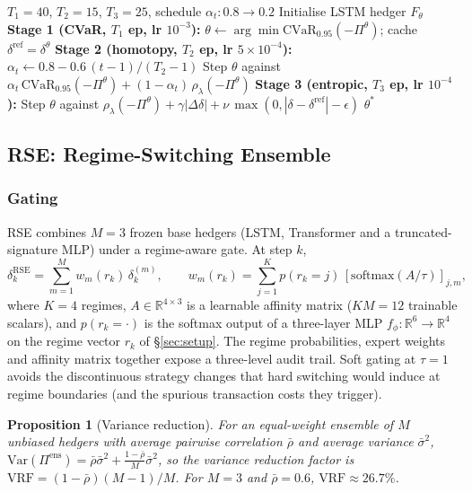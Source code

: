 \documentclass[10pt,letterpaper]{article}
\newcommand{\cvar}{\mathrm{CVaR}}
\newcommand{\R}{\mathbb{R}}
\newtheorem{proposition}{Proposition}
\let\STATE\State
\let\REQUIRE\Require
\let\RETURN\Return
\begin{document}
\begin{algorithm}[ht]
\caption{3SCH curriculum schedule}\label{alg:3sch}
\begin{algorithmic}[1]
\REQUIRE $T_1=40$, $T_2=15$, $T_3=25$, schedule $\alpha_t:0.8\to0.2$
\STATE Initialise LSTM hedger $F_\theta$
\STATE \textbf{Stage 1 (CVaR, $T_1$ ep, lr $10^{-3}$):}
$\theta\leftarrow\arg\min\cvar_{0.95}(-\Pi^\theta)$; cache
$\delta^{\mathrm{ref}}=\delta^\theta$
\STATE \textbf{Stage 2 (homotopy, $T_2$ ep, lr $5\!\times\!10^{-4}$):}
  \STATE $\alpha_t\gets 0.8-0.6\,(t-1)/(T_2-1)$
  \STATE Step $\theta$ against
  $\alpha_t\,\cvar_{0.95}(-\Pi^\theta)+(1-\alpha_t)\,\rho_\lambda(-\Pi^\theta)$
\ENDFOR
\STATE \textbf{Stage 3 (entropic, $T_3$ ep, lr $10^{-4}$):}
  \STATE Step $\theta$ against $\rho_\lambda(-\Pi^\theta)
  + \gamma|\Delta\delta|
  + \nu\,\max(0,|\delta-\delta^{\mathrm{ref}}|-\epsilon)$
\ENDFOR
\STATE \RETURN $\theta^*$
\end{algorithmic}
\end{algorithm}

\subsection{RSE: Regime-Switching Ensemble}\label{sec:rse}

\subsubsection*{Gating}

RSE combines $M=3$ frozen base hedgers (LSTM, Transformer and a
truncated-signature MLP) under a regime-aware gate. At step $k$,
\begin{equation}
\delta_k^{\mathrm{RSE}} = \sum_{m=1}^M w_m(r_k)\,\delta_k^{(m)},\qquad
w_m(r_k) = \sum_{j=1}^K p(r_k=j)\,[\mathrm{softmax}(A/\tau)]_{j,m},
\label{eq:rse}
\end{equation}
where $K=4$ regimes, $A\in\R^{4\times 3}$ is a learnable affinity
matrix ($KM=12$ trainable scalars), and $p(r_k=\cdot)$ is the softmax
output of a three-layer MLP $f_\phi:\R^6\to\R^4$ on the regime
vector $r_k$ of \S\ref{sec:setup}. The regime probabilities, expert
weights and affinity matrix together expose a three-level audit
trail. Soft gating at $\tau=1$ avoids the discontinuous strategy
changes that hard switching would induce at regime boundaries (and
the spurious transaction costs they trigger).

\begin{proposition}[Variance reduction]\label{prop:vrf}
For an equal-weight ensemble of $M$ unbiased hedgers with average
pairwise correlation $\bar\rho$ and average variance $\bar\sigma^2$,
$\mathrm{Var}(\Pi^{\mathrm{ens}})=\bar\rho\bar\sigma^2 +
\tfrac{1-\bar\rho}{M}\bar\sigma^2$, so the variance reduction factor
is $\mathrm{VRF}=(1-\bar\rho)(M-1)/M$. For $M=3$ and $\bar\rho=0.6$,
$\mathrm{VRF}\approx 26.7\%$.
\end{proposition}
\end{document}
